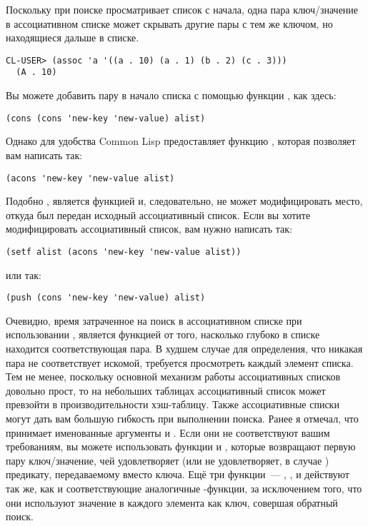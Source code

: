 Поскольку при поиске  просматривает список с начала, одна пара ключ/значение в
ассоциативном списке может скрывать другие пары с тем же ключом, но находящиеся дальше в
списке.

\begin{lstlisting}[style=lisprepl]
  CL-USER> (assoc 'a '((a . 10) (a . 1) (b . 2) (c . 3)))
  (A . 10)
\end{lstlisting}

Вы можете добавить пару в начало списка с помощью функции , как здесь:

\begin{lstlisting}[style=lisprepl]
  (cons (cons 'new-key 'new-value) alist)
\end{lstlisting}

Однако для удобства Common Lisp предоставляет функцию , которая позволяет вам
написать так:

\begin{lstlisting}[style=lisprepl]
  (acons 'new-key 'new-value alist)
\end{lstlisting}

Подобно ,  является функцией и, следовательно, не может
модифицировать место, откуда был передан исходный ассоциативный список. Если вы хотите
модифицировать ассоциативный список, вам нужно написать так:

\begin{lstlisting}[style=lisprepl]
  (setf alist (acons 'new-key 'new-value alist))
\end{lstlisting}

\noindent{}или так:

\begin{lstlisting}[style=lisprepl]
  (push (cons 'new-key 'new-value) alist)
\end{lstlisting}

Очевидно, время затраченное на поиск в ассоциативном списке при использовании
, является функцией от того, насколько глубоко в списке находится
соответствующая пара. В худшем случае для определения, что никакая пара не соответствует
искомой,  требуется просмотреть каждый элемент списка. Тем не менее, поскольку
основной механизм работы ассоциативных списков довольно прост, то на небольших таблицах
ассоциативный список может превзойти в производительности хэш-таблицу.  Также
ассоциативные списки могут дать вам большую гибкость при выполнении поиска. Ранее я
отмечал, что  принимает именованные аргументы  и . Если
они не соответствуют вашим требованиям, вы можете использовать функции  и
, которые возвращают первую пару ключ/значение, чей 
удовлетворяет (или не удовлетворяет, в случае ) предикату,
передаваемому вместо ключа. Ещё три функции~--- , , и
 действуют так же, как и соответствующие аналогичные
-функции, за исключением того, что они используют значение в 
каждого элемента как ключ, совершая обратный поиск.

